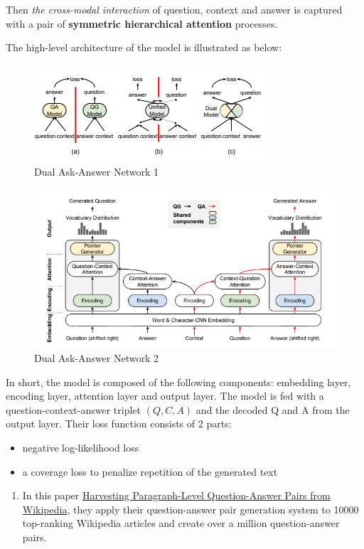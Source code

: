 \documentclass{acm_proc_article-sp}
\providecommand{\tightlist}{%
  \setlength{\itemsep}{0pt}\setlength{\parskip}{0pt}}
\begin{document}
Then \emph{the cross-modal interaction} of question, context and answer
is captured with a pair of \textbf{symmetric hierarchical attention}
processes.

The high-level architecture of the model is illustrated as below:

\begin{figure}
\centering
\includegraphics{img/qgqa.png}
\caption{Dual Ask-Answer Network 1}
\end{figure}

\begin{figure}
\centering
\includegraphics{img/daan.png}
\caption{Dual Ask-Answer Network 2}
\end{figure}

In short, the model is composed of the following components: embedding
layer, encoding layer, attention layer and output layer. The model is
fed with a question-context-answer triplet \((Q,C,A)\) and the decoded Q
and A from the output layer. Their loss function consists of 2 parts:

\begin{itemize}
\tightlist
\item
  negative log-likelihood loss
\item
  a coverage loss to penalize repetition of the generated text
\end{itemize}

\begin{enumerate}
\def\labelenumi{\arabic{enumi}.}
\setcounter{enumi}{1}
\tightlist
\item
  In this paper \href{https://arxiv.org/pdf/1805.05942.pdf}{Harvesting
  Paragraph-Level Question-Answer Pairs from Wikipedia}, they apply
  their question-answer pair generation system to 10000 top-ranking
  Wikipedia articles and create over a million question-answer pairs.
\end{enumerate}
\end{document}
